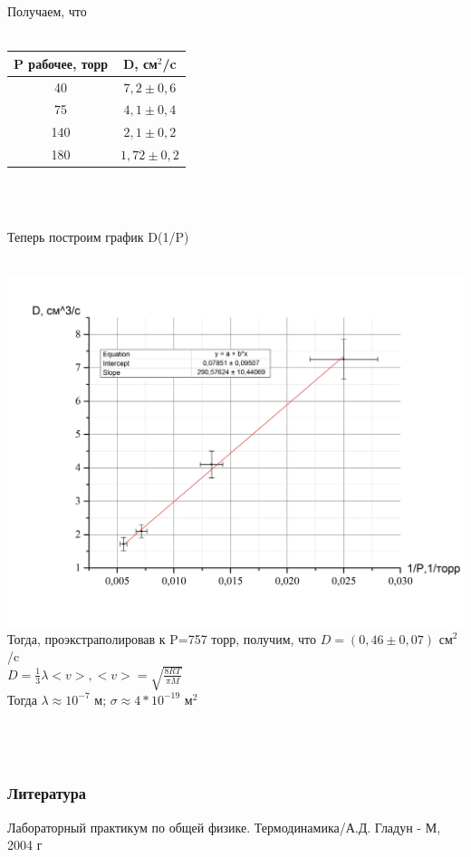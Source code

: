 \documentclass[11pt]{article}
\begin{document}
\newpage
Получаем, что\\
\ \\
\begin{tabular}{|c|c|}
\hline 
P рабочее, торр & D, см$^2$/c \\ 
\hline 
40 & $7,2\pm 0,6$ \\ 
\hline 
75 & $4,1\pm 0,4$ \\ 
\hline 
140 & $2,1\pm 0,2$ \\ 
\hline 
180 & $1,72\pm 0,2$ \\ 
\hline 
\end{tabular} \\
\ \\
\begin{center}
Теперь построим график D(1/P)
\end{center}
\ \\
\includegraphics[scale=0.6]{Graph9.jpg}\\
Тогда, проэкстраполировав к P=757 торр, получим, что $D=(0,46\pm 0,07)$ см$^2$/c
\ \\
$D=\frac{1}{3}\lambda <v>, <v>=\sqrt{\frac{8RT}{\pi M}}$ \\
Тогда $\lambda\approx 10^{-7}$ м; $\sigma\approx4*10^{-19}$ м$^2$
\noindent 
\ \\
\ \\
\ \\
\ \\
\indent \subsubsection*{Литература}
Лабораторный практикум по общей физике. Термодинамика/А.Д. Гладун - М, 2004 г\\
\end{document}

